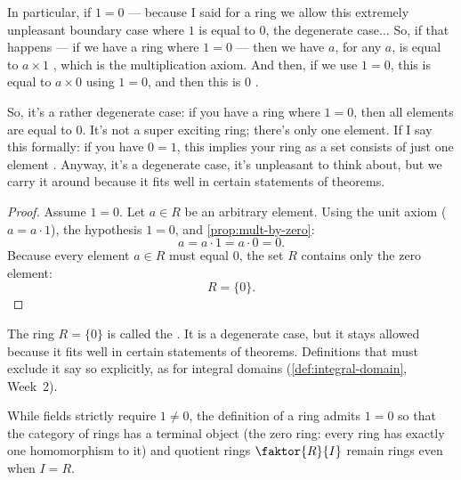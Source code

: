 \begin{speech}[00:11:32 - 00:12:43]
In particular, if $1 = 0$  --- because I said for a ring we allow this extremely unpleasant boundary case where $1$ is equal to $0$, the degenerate case... So, if that happens --- if we have a ring where $1 = 0$ --- then we have $a$, for any $a$, is equal to $a \times 1$ , which is the multiplication axiom. And then, if we use $1 = 0$, this is equal to $a \times 0$  using $1 = 0$, and then this is $0$ .

So, it's a rather degenerate case: if you have a ring where $1 = 0$, then all elements are equal to $0$. It's not a super exciting ring; there's only one element. If I say this formally: if you have $0 = 1$, this implies your ring as a set consists of just one element . Anyway, it's a degenerate case, it's unpleasant to think about, but we carry it around because it fits well in certain statements of theorems.
\end{speech}

\begin{content}

\begin{proof}
Assume $1 = 0$. Let $a \in R$ be an arbitrary element. Using the unit axiom ($a = a \cdot 1$), the hypothesis $1 = 0$, and \cref{prop:mult-by-zero}:
\[
a = a \cdot 1 = a \cdot 0 = 0.
\]
Because every element $a \in R$ must equal $0$, the set $R$ contains only the zero element:
\[
R = \{0\}.
\]
\end{proof}

\begin{remark}
The ring $R = \{0\}$ is called the . It is a degenerate case, but it stays allowed because it fits well in certain statements of theorems. Definitions that must exclude it say so explicitly, as for integral domains (\cref{def:integral-domain}, Week~2).
\end{remark}
\end{content}

\begin{aiNote}
While fields strictly require $1 \neq 0$, the definition of a ring admits $1 = 0$ so that the category of rings has a terminal object (the zero ring: every ring has exactly one homomorphism to it) and quotient rings $\faktor{R}{I}$ remain rings even when $I = R$.
\end{aiNote}

